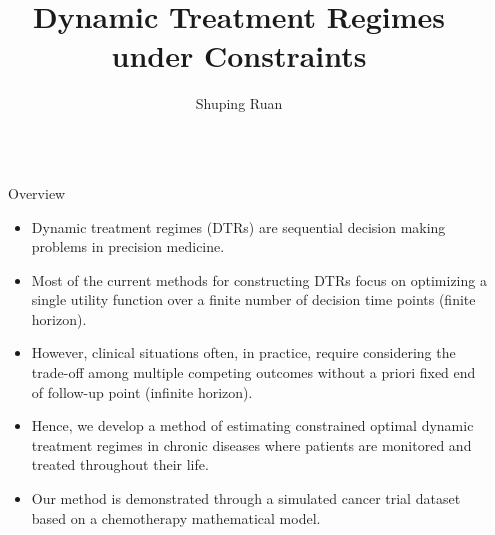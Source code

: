 \documentclass[final,hyperref={pdfpagelabels=false}]{beamer}
\title{\huge Dynamic Treatment Regimes under Constraints} %
\author{Shuping Ruan} %
\institute{Department of Statistics, North Carolina State University} %
\begin{document}

\begin{frame}[t] %

\begin{columns}[t] %

\begin{column}{.02\textwidth}\end{column} %

\begin{column}{.465\textwidth} %


\begin{block}{Overview}
	\begin{itemize}
		\item Dynamic treatment regimes (DTRs) are sequential decision making problems in precision medicine.
		\item Most of the current methods for constructing DTRs focus on optimizing a single utility function over a finite number of decision time points (finite horizon).
		\item However, clinical situations often, in practice, require considering the trade-off among multiple competing outcomes without a priori fixed end of follow-up point (infinite horizon). 
		\item  Hence, we develop a method of estimating constrained optimal dynamic treatment regimes in chronic diseases where patients are monitored and treated throughout their life. 
		\item  Our method is demonstrated through a simulated cancer trial dataset based on a chemotherapy mathematical model.
	\end{itemize}
\end{block}

            

\end{column}
\end{columns}
\end{frame}
\end{document}
